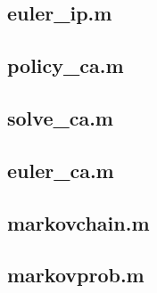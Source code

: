 \documentclass[12pt]{article}
\newcommand{\1}{{\bf 1}} %
\begin{document}
\subsection*{euler\_ip.m}

\subsection*{policy\_ca.m}

\subsection*{solve\_ca.m}

\subsection*{euler\_ca.m}

\subsection*{markovchain.m}

\subsection*{markovprob.m}

\end{document}
